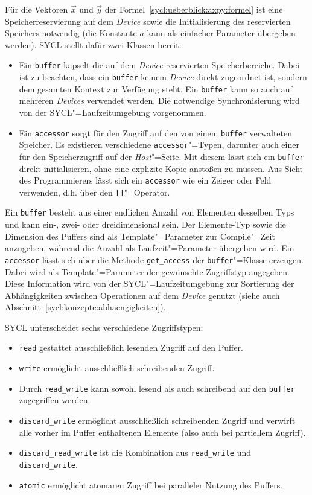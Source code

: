 Für die Vektoren $\vec{x}$ und $\vec{y}$ der
Formel~\ref{sycl:ueberblick:axpy:formel} ist eine Speicherreservierung auf dem
\textit{Device} sowie die Initialisierung des reservierten Speichers notwendig
(die Konstante $a$ kann als einfacher Parameter übergeben werden). SYCL stellt
dafür zwei Klassen bereit:
%
\begin{itemize}
    \item Ein \texttt{buffer} kapselt die auf dem \textit{Device} reservierten
          Speicherbereiche. Dabei ist zu beachten, dass ein \texttt{buffer}
          keinem \textit{Device} direkt zugeordnet ist, sondern dem gesamten
          Kontext zur Verfügung steht. Ein \texttt{buffer} kann so auch auf
          mehreren \textit{Devices} verwendet werden. Die notwendige
          Synchronisierung wird von der SYCL"=Laufzeitumgebung vorgenommen.
    \item Ein \texttt{accessor} sorgt für den Zugriff auf den von einem
          \texttt{buffer} verwalteten Speicher. Es existieren verschiedene
          \texttt{accessor}"=Typen, darunter auch einer für den Speicherzugriff
          auf der \textit{Host}"=Seite. Mit diesem lässt sich ein
          \texttt{buffer} direkt initialisieren, ohne eine explizite Kopie
          anstoßen zu müssen. Aus Sicht des Programmierers lässt sich ein
          \texttt{accessor} wie ein Zeiger oder Feld verwenden, d.h. über den
          \texttt{[]}"=Operator.
\end{itemize}
%
\noindent
Ein \texttt{buffer} besteht aus einer endlichen Anzahl von Elementen desselben
Typs und kann ein-, zwei- oder dreidimensional sein. Der Elemente-Typ sowie die
Dimension des Puffers sind als Template"=Parameter zur Compile"=Zeit anzugeben,
während die Anzahl als Laufzeit"=Parameter übergeben wird. Ein \texttt{accessor}
lässt sich über die Methode \texttt{get\_access} der \texttt{buffer}"=Klasse
erzeugen. Dabei wird als Template"=Parameter der gewünschte Zugriffstyp
angegeben. Diese Information wird von der SYCL"=Laufzeitumgebung zur Sortierung
der Abhängigkeiten zwischen Operationen auf dem \textit{Device} genutzt (siehe
auch Abschnitt~\ref{sycl:konzepte:abhaengigkeiten}).

SYCL unterscheidet sechs verschiedene Zugriffstypen:
\begin{itemize}
    \item \texttt{read} gestattet ausschließlich lesenden Zugriff auf den
          Puffer.
    \item \texttt{write} ermöglicht ausschließlich schreibenden Zugriff.
    \item Durch \texttt{read\_write} kann sowohl lesend als auch schreibend
          auf den \texttt{buffer} zugegriffen werden.
    \item \texttt{discard\_write} ermöglicht ausschließlich schreibenden Zugriff
          und verwirft alle vorher im Puffer enthaltenen Elemente (also auch bei
          partiellem Zugriff).
    \item \texttt{discard\_read\_write} ist die Kombination aus
          \texttt{read\_write} und \texttt{discard\_write}.
    \item \texttt{atomic} ermöglicht atomaren Zugriff bei paralleler Nutzung des
          Puffers.
\end{itemize}

